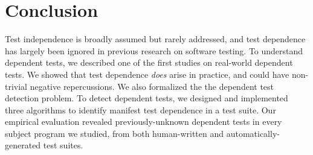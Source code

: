 \section{Conclusion}
\label{sec:questions}

Test independence is broadly assumed but rarely addressed, and
test dependence has largely been ignored in previous
research on software testing. 
To understand dependent tests, we described one of the first studies on
real-world dependent tests. We showed that 
test dependence \textit{does} arise in practice, and could have
non-trivial negative repercussions. We also
formalized the the dependent test detection
problem. To detect dependent tests, we designed
and implemented three algorithms to identify manifest test dependence
in a test suite. Our empirical evaluation revealed
previously-unknown dependent tests in every subject program
we studied, from both human-written and automatically-generated test
suites.

\begin{comment}
The results of this paper offer initial answers to the four questions we posed
in the introduction. First, test dependence \textit{does}
arise in practice, from both human-written test suites and automatically-generated
test suites. Second, dependent tests can have
non-trivial negative repercussions. Third, we speculate that this
problem is not thoroughly examined before due to the
lack of empirical evidence, a rigorous problem definition,
and detection algorithms; alternatively people may simply believe that well-designed
test suites do not have this problem.
Fourth,
detecting manifest dependent tests is a NP-complete problem,
for which efficient algorithms are unlikely to exist. However,
in practice, a simple algorithm like the randomized algorithm
described in this paper can work fairly well.
\end{comment}

